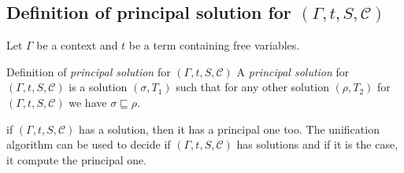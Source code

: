 \documentclass[8pt]{beamer}
\begin{document}
\subsection{Definition of principal solution for $(\Gamma, t,S, \mathcal{C})$}

\begin{frame}
    Let $\Gamma$ be a context and $t$ be a term containing free variables.
    \begin{block}{Definition of \emph{principal solution} for 
            $(\Gamma, t, S, \mathcal{C})$}
        A  \emph{principal solution} for $(\Gamma, t, S, \mathcal{C})$ 
        is a solution $(\sigma, T_{1})$ such that for any other solution
        $(\rho, T_2)$ for $(\Gamma, t, S, \mathcal{C})$ we have $\sigma 
        \sqsubseteq \rho$.
    \end{block}
    \pause
    \begin{theorem}
        if $(\Gamma, t, S, \mathcal{C})$ has a solution, then it has a 
        principal one too. The unification algorithm can be used to
        decide if $(\Gamma, t, S, \mathcal{C})$ has solutions and if it 
        is the case, it compute the principal one.
    \end{theorem}
\end{frame}
\end{document}
